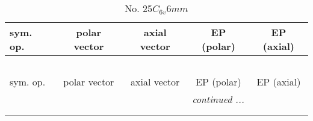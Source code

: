 \documentclass[fleqn,10pt,landscape]{jsarticle}
\begin{document}
\newpage
\begin{center}
\renewcommand{\arraystretch}{1.3}
\begin{longtable}{lcccc}
\caption{No. 25\quad$C_{6v}$\quad$6mm$\quad[ hexagonal ]}
 \\
 \hline \hline
sym. op. & polar vector & axial vector & EP (polar) & EP (axial) \\ \hline \endfirsthead

\multicolumn{4}{l}{\tablename\ \thetable{}} \\
 \hline \hline
sym. op. & polar vector & axial vector & EP (polar) & EP (axial) \\ \hline \endhead

 \hline \hline
\multicolumn{4}{r}{\footnotesize\it continued ...} \\ \endfoot

 \hline \hline
\multicolumn{4}{r}{} \\ \endlastfoot


\end{longtable}
\end{center}
\end{document}

